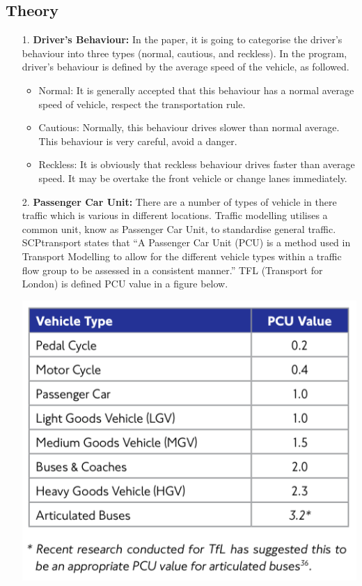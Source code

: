 \documentclass[11pt]{article}
\begin{document}
	\subsection{Theory}
	\begin{itemize}
		\item[1. ]\textbf{Driver’s Behaviour:} 
		In the paper, it is going to categorise the driver’s behaviour into three types (normal, cautious, and reckless). In the program, driver’s behaviour is defined by the average speed of the vehicle, as followed.
		\begin{itemize}
			\item{} Normal: It is generally accepted that this behaviour has a normal average speed of vehicle, respect the transportation rule.  
			\item{} Cautious: Normally, this behaviour drives slower than normal average. This behaviour is very careful, avoid a danger. 
			\item{} Reckless: It is obviously that reckless behaviour drives faster than average speed. It may be overtake the front vehicle or change lanes immediately. 
  		\end{itemize}	
  		\item[2. ]\textbf{Passenger Car Unit:}
  		There are a number of types of vehicle in there traffic which is various in different locations. Traffic modelling utilises a common unit, know as Passenger Car Unit, to standardise general traffic. SCPtransport \cite{SCPtransport} states that “A Passenger Car Unit (PCU) is a method used in Transport Modelling to allow for the different vehicle types within a traffic flow group to be assessed in a consistent manner.”  TFL (Transport for London) \cite{TFL} is defined PCU value in a figure below.\\
		\begin{center}			
			\includegraphics[scale = 0.5]{Figure05}

\end{center}
\end{itemize}
\end{document}
